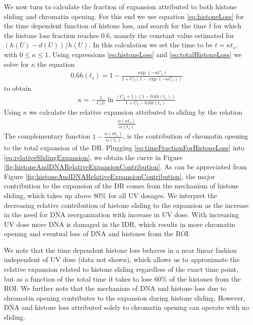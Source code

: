 \documentclass[12pt]{article}
\newcommand{\beq}{\begin{eqnarray}}
\newcommand{\eeq}{\end{eqnarray}}
\begin{document}
We now turn to calculate the fraction of expansion attributed to both histone sliding and chromatin opening. For this end we use equation \ref{eq:histoneLoss} for the time dependent function of histone loss, and search for the time $\hat{t}$ for which the histone loss fraction reaches 0.6, namely the constant value estimated for $(h(U)-d(U))/h(U)$. In this calculation we set the time to be $t=\kappa t_s$, with $0\leq \kappa\leq 1$. Using expressions \ref{eq:histoneLoss} and \ref{eq:totalHistoneLoss} we solve for $\kappa$ the equation
\beq
0.6h(t_s)=1-\frac{\exp(-\kappa C_1)}{ 1+C_2(1-\exp(-\kappa C_1))}
\eeq
to obtain 
\beq \label{eq:timeFractionForHistoneLoss}
\kappa = -\frac{1}{C_1 U}\ln{\frac{(C_2+1)(1-0.6h(t_s))}{1+C_2 -0.6h(t_s)}}
\eeq
Using $\kappa$ we calculate the relative expansion attributed to sliding by the relation 
\beq \label{eq:relativeSlidingExpansion}
\frac{\alpha(\kappa t_s)}{\alpha (t_s)}
\eeq
The complementary function $1-\frac{\alpha(\kappa t_s)}{\alpha(t_s)}$, is the contribution of chromatin opening to the total expansion of the DR. Plugging \ref{eq:timeFractionForHistoneLoss} into \ref{eq:relativeSlidingExpansion}, we obtain the curve in Figure \ref{fig:histoneAndDNARelativeExpansionContribution}. As can be appreciated from Figure \ref{fig:histoneAndDNARelativeExpansionContribution}, the major contribution to the expansion of the DR comes from the mechanism of histone sliding, which takes up above 80\% for all UV dosages. We interpret the decreasing relative contribution of histone sliding to the expansion as the increase in the need for DNA reorganization with increase in UV dose. With increasing UV dose more DNA is damaged in the IDR, which results in more chromatin opening and eventual loss of DNA and histones from the ROI.

We note that the time dependent histone loss behaves in a near linear fashion independent of  UV dose (data not shown), which allows us to approximate the relative expansion related to histone sliding regardless of the exact time point, but as a function of the total time it takes to lose 60\% of the histones from the ROI. We further note that the mechanism of DNA and histone loss due to chromatin opening contributes to the expansion during histone sliding. However, DNA and histone loss attributed solely to chromatin opening can operate with no sliding. 
\end{document}
